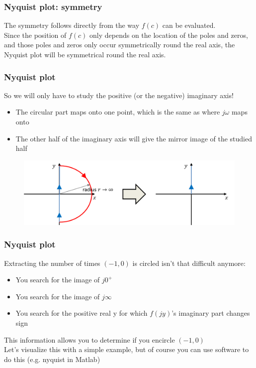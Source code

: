 \begin{frame}
	\frametitle{Nyquist plot: symmetry}
	\vspace{-12ex}
	The symmetry follows directly from the way $f(c)$ can be evaluated.\\
	\medskip
	Since the position of $f(c)$ only depends on the location of the poles and zeros, and those poles and zeros only occur symmetrically round the real axis, the Nyquist plot will be symmetrical round the real axis.
\end{frame}

\begin{frame}
	\frametitle{Nyquist plot}
	So we will only have to study the positive (or the negative) imaginary axis!\\
	\begin{itemize}
		\item The circular part maps onto one point, which is the same as where $j\omega$ maps onto
		\item The other half of the imaginary axis will give the mirror image of the studied half
	\end{itemize}	
	\begin{figure}
		\includegraphics[width=1\linewidth]{plot}
	\end{figure}
\end{frame}

\begin{frame}
	\frametitle{Nyquist plot}
	\vspace{-6ex}
	Extracting the number of times $(-1,0)$ is circled isn't that difficult anymore:
	\begin{itemize}
		\item You search for the image of $j0^+$
		\item You search for the image of $j\infty$
		\item You search for the positive real y for which $f(jy)$'s imaginary part changes sign
	\end{itemize}
	This information allows you to determine if you encircle $(-1,0)$\\
	Let's visualize this with a simple example, but of course you can use software to do this (e.g. nyquist in Matlab)
\end{frame}

